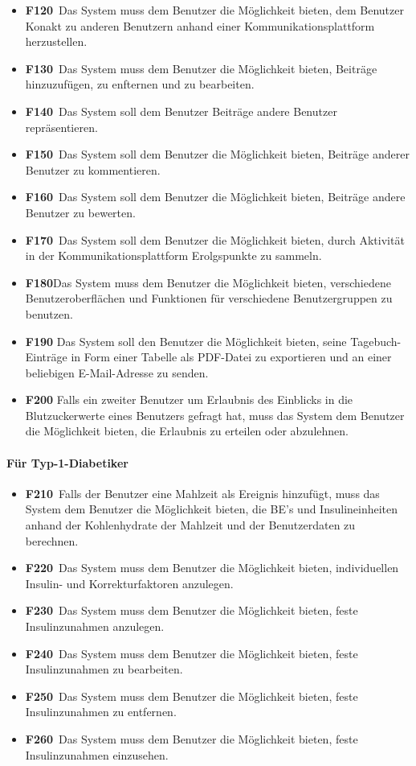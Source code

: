 \documentclass[a4paper,11pt]{article}%
\renewcommand{\\}{\vspace*{0.5\baselineskip} \newline}
\begin{document}
\begin{itemize}
		\item \lbrack \textbf{F120}\rbrack \ Das System muss dem Benutzer die Möglichkeit bieten, dem Benutzer Konakt zu anderen Benutzern anhand einer Kommunikationsplattform herzustellen.
		\item \lbrack \textbf{F130}\rbrack \ Das System muss dem Benutzer die Möglichkeit bieten, Beiträge hinzuzufügen, zu enfternen und zu bearbeiten.
		\item \lbrack \textbf{F140}\rbrack \ Das System soll dem Benutzer Beiträge andere Benutzer repräsentieren.
		\item \lbrack \textbf{F150}\rbrack \ Das System soll dem Benutzer die Möglichkeit bieten, Beiträge anderer Benutzer zu kommentieren.
		\item \lbrack \textbf{F160}\rbrack \ Das System soll dem Benutzer die Möglichkeit bieten, Beiträge andere Benutzer zu bewerten.
		\item \lbrack \textbf{F170}\rbrack \ Das System soll dem Benutzer die Möglichkeit bieten, durch Aktivität in der Kommunikationsplattform Erolgspunkte zu sammeln.
		\item \lbrack \textbf{F180}\rbrack Das System muss dem Benutzer die Möglichkeit bieten, verschiedene Benutzeroberflächen und Funktionen für verschiedene Benutzergruppen zu benutzen.
		\item \lbrack \textbf{F190} Das System soll den Benutzer die Möglichkeit bieten, seine Tagebuch-Einträge in Form einer Tabelle als PDF-Datei zu exportieren und an einer beliebigen E-Mail-Adresse zu senden.
		\item \lbrack \textbf{F200} Falls ein zweiter Benutzer um Erlaubnis des Einblicks in die Blutzuckerwerte eines Benutzers gefragt hat, muss das System dem Benutzer die Möglichkeit bieten, die Erlaubnis zu erteilen oder abzulehnen.
	\end{itemize}
		\paragraph{Für Typ-1-Diabetiker}\mbox{}
	\begin{itemize}
		\item \lbrack \textbf{F210}\rbrack \ Falls der Benutzer eine Mahlzeit als Ereignis hinzufügt, muss das System dem Benutzer die Möglichkeit bieten, die BE's und Insulineinheiten anhand der Kohlenhydrate der Mahlzeit und der Benutzerdaten zu berechnen.
		\item \lbrack \textbf{F220}\rbrack \ Das System muss dem Benutzer die Möglichkeit bieten, individuellen Insulin- und Korrekturfaktoren anzulegen.
		\item \lbrack \textbf{F230}\rbrack \ Das System muss dem Benutzer die Möglichkeit bieten, feste Insulinzunahmen anzulegen.
		\item \lbrack \textbf{F240}\rbrack \ Das System muss dem Benutzer die Möglichkeit bieten, feste Insulinzunahmen zu bearbeiten.
		\item \lbrack \textbf{F250}\rbrack \ Das System muss dem Benutzer die Möglichkeit bieten, feste Insulinzunahmen zu entfernen.
		\item \lbrack \textbf{F260}\rbrack \ Das System muss dem Benutzer die Möglichkeit bieten, feste Insulinzunahmen einzusehen.
	\end{itemize}
\end{document}

